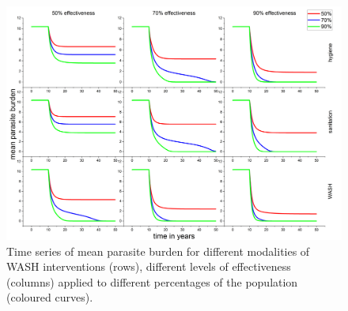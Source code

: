 \documentclass[12pt,a4paper]{article}
\theoremstyle{plain}%
\theoremstyle{definition}
\theoremstyle{remark}
\begin{document}
	\begin{figure}[h!]
		\centering
		\includegraphics[width=.99\linewidth]{model1wash}
		\caption{Time series of mean parasite burden for different modalities of WASH interventions (rows), different levels of effectiveness (columns) applied to different percentages of the population (coloured curves).}
		\label{fig:model1wash}
	\end{figure}
\end{document}
